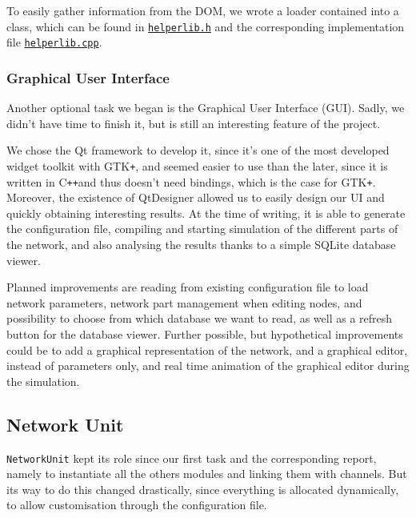 \documentclass[12pt,a4paper]{article}
\newcommand{\Cpp}{C\texttt{++}}
\begin{document}
To easily gather information from the DOM, we wrote a loader contained into a class, which can be found in \href{https://github.com/suai-ipsa2018/ExoMars2020/blob/master/ExoMars2020/Network/helperlib.h}{\texttt{helperlib.h}} and the corresponding implementation file \href{https://github.com/suai-ipsa2018/ExoMars2020/blob/master/ExoMars2020/Network/helperlib.cpp}{\texttt{helperlib.cpp}}.

\subsubsection*{Graphical User Interface}
Another optional task we began is the Graphical User Interface (GUI). Sadly, we didn't have time to finish it, but is still an interesting feature of the project.

We chose the Qt framework to develop it, since it's one of the most developed widget toolkit with GTK\texttt{+}, and seemed easier to use than the later, since it is written in \Cpp and thus doesn't need bindings, which is the case for GTK\texttt{+}. Moreover, the existence of QtDesigner allowed us to easily design our UI and quickly obtaining interesting results. At the time of writing, it is able to generate the configuration file, compiling and starting simulation of the different parts of the network, and also analysing the results thanks to a simple SQLite database viewer.

Planned improvements are reading from existing configuration file to load network parameters, network part management when editing nodes, and possibility to choose from which database we want to read, as well as a refresh button for the database viewer.
Further possible, but hypothetical improvements could be to add a graphical representation of the network, and a graphical editor, instead of parameters only, and real time animation of the graphical editor during the simulation.

\subsection{Network Unit}
\texttt{NetworkUnit} kept its role since our first task and the corresponding report, namely to instantiate all the others modules and linking them with channels. But its way to do this changed drastically, since everything is allocated dynamically, to allow customisation through the configuration file.
\end{document}
